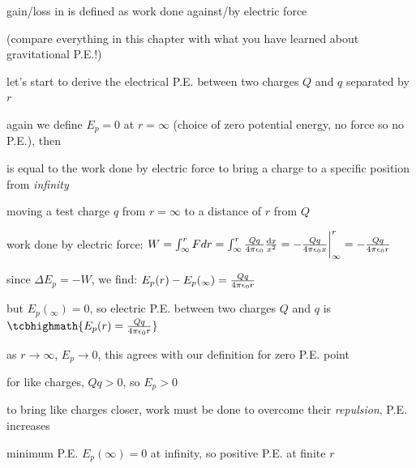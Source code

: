 gain/loss in  is defined as work done against/by electric force

(compare everything in this chapter with what you have learned about gravitational P.E.!)

let's start to derive the electrical P.E. between two charges $Q$ and $q$ separated by $r$

again we define $E_p=0$ at $r=\infty$ (choice of zero potential energy, no force so no P.E.), then

\begin{ilight}
	 is equal to the work done by electric force to bring a charge to a specific position from \emph{infinity}
\end{ilight} 

moving a test charge $q$ from $r=\infty$ to a distance of $r$ from $Q$

\begin{center}
\end{center}

work done by electric force: $W=\int^r_\infty F dr = \int^r_\infty \frac{Qq}{4\pi\epsilon_0} \frac{\mathrm{d} x}{x^2} = - \frac{Qq}{4\pi\epsilon_0 x}\bigg|^r_\infty = - \frac{Qq}{4\pi\epsilon_0 r} $

\eqyskip

since $\Delta E_p=-W$, we find: $E_p(r) - E_p(_\infty) = \frac{Qq}{4\pi\epsilon_0 r}$

but $E_p(_\infty) = 0$,  so electric P.E. between two charges $Q$ and $q$ is $\tcbhighmath{E_p(r) = \frac{Qq}{\ec r}}$

\cmt as $r \to \infty$, $E_p \to 0$, this agrees with our definition for zero P.E. point

\cmt for like charges, $Qq > 0$, so $E_p > 0$

to bring like charges closer, work must be done to overcome their \emph{repulsion}, P.E. increases

minimum P.E. $E_p(\infty)=0$ at infinity, so positive P.E. at finite $r$

